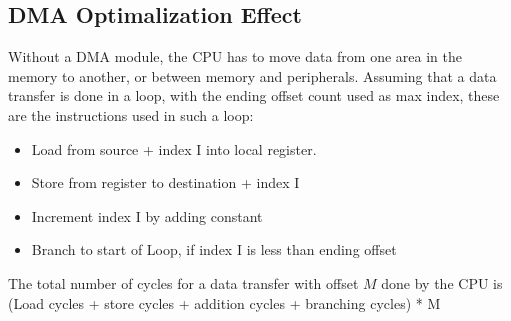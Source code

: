 %

%


\subsection{DMA Optimalization Effect}
Without a DMA module, the CPU has to move data from one area in the memory to another, or between memory and peripherals.
Assuming that a data transfer is done in a loop, with the ending offset count used as max index, these are the instructions used in such a loop:
\begin{itemize}
    \item Load from source + index I into local register.
    \item Store from register to destination + index I
    \item Increment index I by adding constant
    \item Branch to start of Loop, if index I is less than ending offset
\end{itemize}

The total number of cycles for a data transfer with offset $M$ done by the CPU is
(Load cycles + store cycles + addition cycles + branching cycles) * M 

